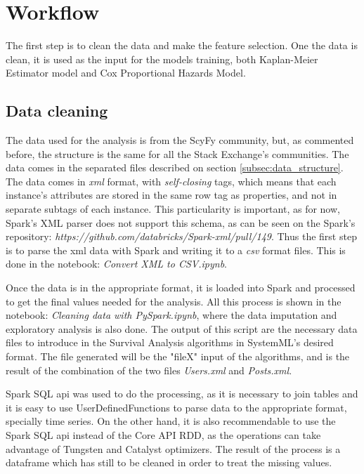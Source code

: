 \documentclass[11pt]{book} %
\begin{document}
  \section{Workflow}

    The first step is to clean the data and make the feature selection. One the data is clean, it is used as the input for the models training, both Kaplan-Meier Estimator model and Cox Proportional Hazards Model.

  \subsection{Data cleaning}

    The data used for the analysis is from the ScyFy community, but, as commented before, the structure is the same for all the Stack Exchange's communities. The data comes in the separated files described on section \ref{subsec:data_structure}. The data comes in \emph{xml} format, with \emph{self-closing} tags, which means that each instance's attributes are stored in the same row tag as properties, and not in separate subtags of each instance. This particularity is important, as for now, Spark's XML parser does not support this schema, as can be seen on the Spark's repository: \emph{https://github.com/databricks/Spark-xml/pull/149}. Thus the first step is to parse the xml data with Spark and writing it to a \emph{csv} format files. This is done in the notebook: \emph{Convert XML to CSV.ipynb}.

    Once the data is in the appropriate format, it is loaded into Spark and processed to get the final values needed for the analysis. All this process is shown in the notebook: \emph{Cleaning data with PySpark.ipynb}, where the data imputation and exploratory analysis is also done. The output of this script are the necessary data files to introduce in the Survival Analysis algorithms in SystemML's desired format. The file generated will be the "fileX" input of the algorithms, and is the result of the combination of the two files \emph{Users.xml} and \emph{Posts.xml}.

    Spark SQL api was used to do the processing, as it is necessary to join tables and it is easy to use UserDefinedFunctions to parse data to the appropriate format, specially time series. On the other hand, it is also recommendable to use the Spark SQL api instead of the Core API RDD, as the operations can take advantage of Tungsten and Catalyst optimizers. The result of the process is a dataframe which has still to be cleaned in order to treat the missing values.
\end{document}
